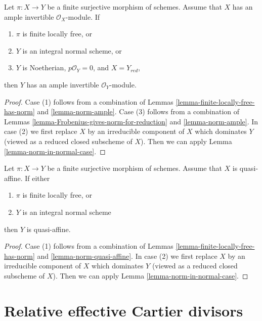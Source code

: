 \begin{proposition}
\label{proposition-push-down-ample}
Let $\pi : X \to Y$ be a finite surjective morphism of schemes.
Assume that $X$ has an ample invertible $\mathcal{O}_X$-module. If
\begin{enumerate}
\item $\pi$ is finite locally free, or
\item $Y$ is an integral normal scheme, or
\item $Y$ is Noetherian, $p\mathcal{O}_Y = 0$, and $X = Y_{red}$,
\end{enumerate}
then $Y$ has an ample invertible $\mathcal{O}_Y$-module.
\end{proposition}

\begin{proof}
Case (1) follows from a combination of
Lemmas \ref{lemma-finite-locally-free-has-norm} and \ref{lemma-norm-ample}.
Case (3) follows from a combination of
Lemmas \ref{lemma-Frobenius-gives-norm-for-reduction} and
\ref{lemma-norm-ample}.
In case (2) we first replace $X$ by an irreducible component of $X$
which dominates $Y$ (viewed as a reduced closed subscheme of $X$).
Then we can apply Lemma \ref{lemma-norm-in-normal-case}.
\end{proof}

\begin{lemma}
\label{lemma-push-down-quasi-affine}
Let $\pi : X \to Y$ be a finite surjective morphism of schemes.
Assume that $X$ is quasi-affine. If either
\begin{enumerate}
\item $\pi$ is finite locally free, or
\item $Y$ is an integral normal scheme
\end{enumerate}
then $Y$ is quasi-affine.
\end{lemma}

\begin{proof}
Case (1) follows from a combination of Lemmas
\ref{lemma-finite-locally-free-has-norm} and \ref{lemma-norm-quasi-affine}.
In case (2) we first replace $X$ by an irreducible component of $X$
which dominates $Y$ (viewed as a reduced closed subscheme of $X$).
Then we can apply Lemma \ref{lemma-norm-in-normal-case}.
\end{proof}





\section{Relative effective Cartier divisors}
\label{section-effective-Cartier-morphisms}

